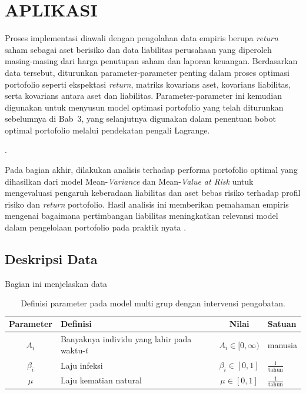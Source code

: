 \chapter{\normalsize APLIKASI}

Proses implementasi diawali dengan pengolahan data empiris berupa 
\textit{return} saham sebagai aset berisiko dan data liabilitas perusahaan 
yang diperoleh masing-masing dari harga penutupan saham dan laporan keuangan. Berdasarkan data tersebut, diturunkan 
parameter-parameter penting dalam proses optimasi portofolio seperti ekspektasi \textit{return}, matriks kovarians aset,
kovarians liabilitas, serta kovarians antara aset dan liabilitas. 
Parameter-parameter ini kemudian digunakan untuk menyusun model optimasi portofolio yang telah diturunkan sebelumnya di Bab~3, yang selanjutnya digunakan dalam penentuan bobot optimal portofolio melalui pendekatan pengali Lagrange.

\cite{Bazaraa}.



Pada bagian akhir, dilakukan analisis terhadap performa portofolio optimal yang 
dihasilkan dari model Mean-\textit{Variance} dan Mean-\textit{Value at Risk} untuk mengevaluasi pengaruh 
keberadaan liabilitas dan aset bebas risiko terhadap profil risiko dan 
\textit{return} portofolio. Hasil analisis ini memberikan pemahaman empiris 
mengenai bagaimana pertimbangan liabilitas meningkatkan relevansi model dalam 
pengelolaan portofolio pada praktik nyata \cite{Sofia}.


\section{Deskripsi Data}
Bagian ini menjelaskan data 

\begin{table}[htb]
	\caption{Definisi parameter pada model multi grup dengan intervensi pengobatan.}
	\centering
	\begin{tabular}{|c|p{6cm}|c|p{2cm}|}
		\hline
		\textbf{Parameter}& \textbf{Definisi}& \textbf{Nilai}& \textbf{Satuan}\\
		\hline
		\hline
		$A_i$ & Banyaknya individu yang lahir pada waktu-$t$ & $A_i\in [0,\infty)$ & manusia \\
		\hline
		$\beta_i$ & Laju infeksi & $\beta_i\in [0,1]$ & $\frac{1}{\text{tahun}}$ \\
		\hline
		$\mu$ & Laju kematian natural& $\mu\in [0,1]$ & $\frac{1}{\text{tahun}}$ \\
		\hline
	\end{tabular}
\label{table:32}
\end{table}

